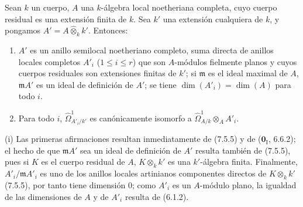 \begin{lemma}[18.11.4]
\label{IV.18.11.4}
Sean $k$ un cuerpo, $A$ una $k$-álgebra local noetheriana completa, cuyo cuerpo residual es una extensión finita de $k$. Sea $k'$ una extensión cualquiera de $k$, y pongamos $A'=A\widehat{\otimes}_k k'$. Entonces:
\begin{enumerate}
  \item[\textup{(i)}] $A'$ es un anillo semilocal noetheriano completo, suma directa de anillos locales completos $A'_i$ \textup{($1\leq i\leq r$)} que son $A$-módulos fielmente planos y cuyos cuerpos residuales son extensiones finitas de $k'$; si $\mathfrak m$ es el ideal maximal de $A$, $\mathfrak mA'$ es un ideal de definición de $A'$; se tiene $\dim(A'_i)=\dim(A)$ para todo $i$.
  \item[\textup{(ii)}] Para todo $i$, $\hat{\Omega}^1_{A'_i/k'}$ es canónicamente isomorfo a $\hat{\Omega}^1_{A/k}\otimes_A A'_i$.
\end{enumerate}
\end{lemma}


(i) Las primeras afirmaciones resultan inmediatamente de (7.5.5) y de ($\mathbf{0}_{\mathrm I}$, 6.6.2); el hecho de que $\mathfrak mA'$ sea un ideal de definición de $A'$ resulta también de (7.5.5), pues si $K$ es el cuerpo residual de $A$, $K\otimes_k k'$ es una $k'$-álgebra finita. Finalmente, $A'_i/\mathfrak mA'_i$ es uno de los anillos locales artinianos componentes directos de $K\otimes_k k'$ (7.5.5), por tanto tiene dimensión 0; como $A'_i$ es un $A$-módulo plano, la igualdad de las dimensiones de $A$ y de $A'_i$ resulta de (6.1.2).

